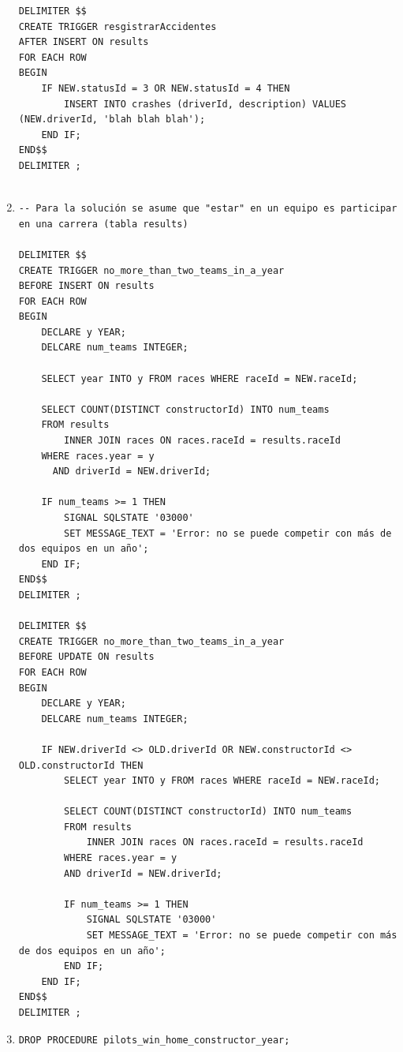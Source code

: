 \documentclass[a4paper]{article}
\begin{document}
\begin{enumerate}
\begin{verbatim}
DELIMITER $$
CREATE TRIGGER resgistrarAccidentes
AFTER INSERT ON results
FOR EACH ROW
BEGIN
    IF NEW.statusId = 3 OR NEW.statusId = 4 THEN
    	INSERT INTO crashes (driverId, description) VALUES (NEW.driverId, 'blah blah blah');
    END IF;
END$$
DELIMITER ;            
            
    \end{verbatim}
    
    \item 
    \begin{verbatim}
-- Para la solución se asume que "estar" en un equipo es participar en una carrera (tabla results)

DELIMITER $$
CREATE TRIGGER no_more_than_two_teams_in_a_year
BEFORE INSERT ON results
FOR EACH ROW
BEGIN
    DECLARE y YEAR;
    DELCARE num_teams INTEGER;

    SELECT year INTO y FROM races WHERE raceId = NEW.raceId;

    SELECT COUNT(DISTINCT constructorId) INTO num_teams
    FROM results
        INNER JOIN races ON races.raceId = results.raceId
    WHERE races.year = y
      AND driverId = NEW.driverId;

    IF num_teams >= 1 THEN 
        SIGNAL SQLSTATE '03000'
        SET MESSAGE_TEXT = 'Error: no se puede competir con más de dos equipos en un año';
    END IF;
END$$
DELIMITER ;

DELIMITER $$
CREATE TRIGGER no_more_than_two_teams_in_a_year
BEFORE UPDATE ON results
FOR EACH ROW
BEGIN
    DECLARE y YEAR;
    DELCARE num_teams INTEGER;

    IF NEW.driverId <> OLD.driverId OR NEW.constructorId <> OLD.constructorId THEN
        SELECT year INTO y FROM races WHERE raceId = NEW.raceId;

        SELECT COUNT(DISTINCT constructorId) INTO num_teams
        FROM results
            INNER JOIN races ON races.raceId = results.raceId
        WHERE races.year = y
        AND driverId = NEW.driverId;

        IF num_teams >= 1 THEN 
            SIGNAL SQLSTATE '03000'
            SET MESSAGE_TEXT = 'Error: no se puede competir con más de dos equipos en un año';
        END IF;
    END IF;
END$$
DELIMITER ;
    \end{verbatim}

    \item 
    \begin{verbatim}
DROP PROCEDURE pilots_win_home_constructor_year;


\end{verbatim}
\end{enumerate}
\end{document}
